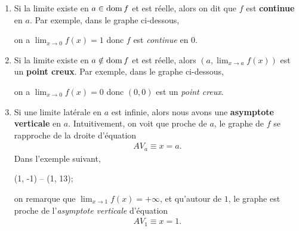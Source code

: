 \documentclass[main.tex]{subfiles}
\begin{document}
\begin{enumerate}
    \item Si la limite existe en $a \in \operatorname{dom} f$ et est réelle,
        alors on dit que $f$ est \textbf{continue} en $a$.
        Par exemple,
        dans le graphe ci-dessous,
        \begin{center}
            \begin{plot}{0.5}{-6}{-1}{6}{3}
            \end{plot}
        \end{center}
        on a $\lim_{x \to 0} f(x) = 1$ donc $f$ est \emph{continue} en $0$.
    \item Si la limite existe en $a \notin \operatorname{dom} f$ et est réelle,
        alors $(a, \lim_{x \to a} f(x))$ est un \textbf{point creux}.
        Par exemple,
        dans le graphe ci-dessous,
        \begin{center}
            \begin{plot}{0.5}{-6}{-2}{6}{2}
            \end{plot}
        \end{center}
        on a $\lim_{x \to 0} f(x) = 0$ donc $(0, 0)$ est un \emph{point creux}.
    \item Si une limite latérale en $a$ est infinie,
        alors nous avons une \textbf{asymptote verticale} en $a$.
        Intuitivement,
        on voit que proche de $a$,
        le graphe de $f$ se rapproche de la droite d'équation
        \begin{align}
            AV_a \equiv x = a.
        \end{align}
        Dans l'exemple suivant,
        \begin{center}
            \begin{plot}{0.25}{-6}{-1}{6}{12}
                \drawline (1, -1) -- (1, 13);
            \end{plot}
        \end{center}
        on remarque que $\lim_{x \to 1} f(x) = +\infty$,
        et qu'autour de $1$,
        le graphe est proche de l'\emph{asymptote verticale} d'équation
        \begin{align}
            AV_1 \equiv x = 1.
        \end{align}
\end{enumerate}
\end{document}
